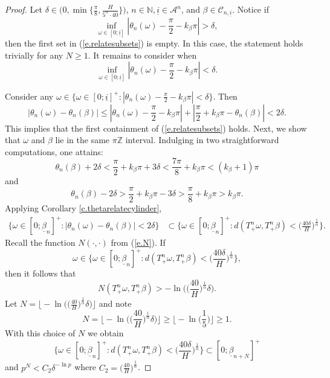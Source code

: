\documentclass{amsart}
\newcommand{\NN}{\mathbb{N}}
\newcommand{\ZZ}{\mathbb{Z}}
\newcommand{\A}{\mathcal{A}}
\newcommand{\C}{\mathcal{C}}
\begin{document}
\begin{proof}
    Let $\delta\in \Big(0, \min\{\frac{\pi}{8}, \frac{H}{5^\alpha \cdot 40}\}\Big)$, $n\in \NN, \underline{i}\in \A^n$, and $\beta\in \C_{n,\underline{i}}$. Notice if
    \[\inf_{\omega\in [0;\underline{i}]}|\theta_n(\omega) - \frac{\pi}{2} - k_\beta\pi| > \delta,\]
    then the first set in (\ref{e.relatesubsets}) is empty. In this case, the statement holds trivially for any $N\geq 1$. It remains to consider when
    \[\inf_{\omega\in [0;\underline{i}]}|\theta_n(\omega) - \frac{\pi}{2} - k_\beta\pi| < \delta.\]
    
    Consider any $\omega\in \{\omega\in [0;\underline{i}]^+: |\theta_n(\omega) - \frac{\pi}{2} -k_{\beta}\pi|<\delta \}$. Then
    \[|\theta_n(\omega) - \theta_n(\beta)| \leq |\theta_n(\omega) - \frac{\pi}{2} -k_\beta \pi| + |\frac{\pi}{2} + k_\beta \pi - \theta_n(\beta)| < 2\delta.\]
    This implies that the first containment of (\ref{e.relatesubsets}) holds. Next, we show that $\omega$ and $\beta$ lie in the same $\pi\ZZ$ interval. Indulging in two straightforward computations, one attains:
    \[\theta_n(\beta) + 2\delta < \frac{\pi}{2} + k_\beta\pi + 3\delta < \frac{7\pi}{8} + k_\beta \pi < (k_\beta+1)\pi\]
    and
    \[\theta_n(\beta) - 2\delta > \frac{\pi}{2} + k_\beta\pi - 3\delta > \frac{\pi}{8} + k_\beta \pi > k_\beta\pi.\]
    Applying Corollary \ref{c.thetarelatecylinder},
    \begin{align*}
        \Big\{\omega\in [0;\underline{\beta}_n]^+: |\theta_n(\omega) - \theta_n(\beta)| < 2\delta\Big\} 
        &\subset \Big\{\omega\in [0;\underline{\beta}_n]^+: d(T^n_+\omega,T^n_+\beta) < \Big(\frac{40\delta}{H}\Big)^{\frac{1}{\alpha}}\Big\}.
    \end{align*}
    Recall the function $N(\cdot, \cdot)$ from (\ref{e.N}). If \[\omega \in \Big\{\omega\in [0;\underline{\beta}_n]^+: d(T^n_+\omega,T^n_+\beta) < \Big(\frac{40\delta}{H}\Big)^{\frac{1}{\alpha}}\Big\},\]
    then it follows that
    \[N(T^n_+\omega, T^n_+\beta) > -\ln\Bigg(\Big(\frac{40}{H}\Big)^{\frac{1}{\alpha}} \delta \Bigg).\]
    Let $N = \Bigg\lfloor -\ln\Bigg(\Big(\frac{40}{H}\Big)^{\frac{1}{\alpha}} \delta \Bigg) \Bigg\rfloor$ and note
    \[N = \Bigg\lfloor-\ln\Bigg(\Big(\frac{40}{H}\Big)^{\frac{1}{\alpha}} \delta  \Bigg)\Bigg\rfloor \geq \Bigg\lfloor-\ln\Bigg(\frac{1}{5} \Bigg)\Bigg\rfloor \geq 1.\]
    With this choice of $N$ we obtain
    \[\Big\{\omega\in [0;\underline{\beta}_n]^+: d(T^n_+\omega,T^n_+\beta) < \Big(\frac{40\delta}{H}\Big)^{\frac{1}{\alpha}}\Big\} \subset [0;\underline{\beta}_{n+N}]^+\]
    and $p^{N} < C_2\delta^{-\ln p}$ where $C_2 = \Big(\frac{40}{H}\Big)^{\frac{1}{\alpha}}$. 
\end{proof}
\end{document}
